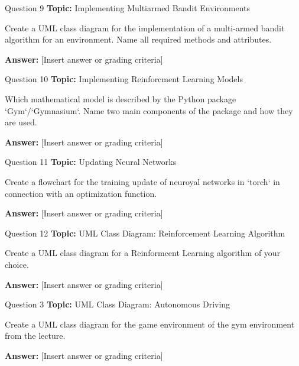 \begin{frame}{Question 9}
    \textbf{Topic:} Implementing Multiarmed Bandit Environments
    \vspace{10pt}

    Create a UML class diagram for the implementation of a multi-armed bandit algorithm for an environment. Name all required methods and attributes. 
    \vspace{20pt}

    \textbf{Answer:} [Insert answer or grading criteria]
\end{frame}

\begin{frame}{Question 10}
    \textbf{Topic:} Implementing Reinforcment Learning Models
    \vspace{10pt}

    Which mathematical model is described by the Python package `Gym`/`Gymnasium`. Name two main components of the package and how they are used. 
    \vspace{20pt}

    \textbf{Answer:} [Insert answer or grading criteria]
\end{frame}

\begin{frame}{Question 11}
    \textbf{Topic:} Updating Neural Networks
    \vspace{10pt}

    Create a flowchart for the training update of neuroyal networks in `torch` in connection with an optimization function.
    \vspace{20pt}

    \textbf{Answer:} [Insert answer or grading criteria]
\end{frame}

\begin{frame}{Question 12}
    \textbf{Topic:} UML Class Diagram: Reinforcement Learning Algorithm
    \vspace{10pt}

    Create a UML class diagram for a Reinformcent Learning algorithm of your choice. 
    \vspace{20pt}

    \textbf{Answer:} [Insert answer or grading criteria]
\end{frame}

\begin{frame}{Question 3}
    \textbf{Topic:} UML Class Diagram: Autonomous Driving
    \vspace{10pt}

    Create a UML class diagram for the game environment of the gym environment from the lecture.
    \vspace{20pt}

    \textbf{Answer:} [Insert answer or grading criteria]
\end{frame}

